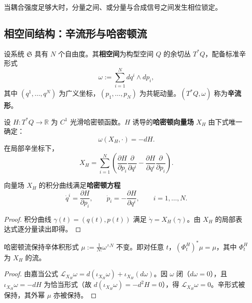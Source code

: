 \begin{proposition}[相位锁定]\label{prop:phase-locking}
当耦合强度足够大时，分量之间、或分量与合成信号之间发生相位锁定。
\end{proposition}

\subsection{相空间结构：辛流形与哈密顿流}\label{subsec:ps_phase_space_symplectic}

\begin{definition}[周期系统的相空间]\label{def:ps_phase_space}
设系统 $\mathfrak{S}$ 具有 $N$ 个自由度。其\textbf{相空间}为构型空间 $Q$ 的余切丛 $T^*Q$，配备标准辛形式
\[
\omega := \sum_{i=1}^{N} dq^i\wedge dp_i,
\]
其中 $(q^1,\dots,q^N)$ 为广义坐标，$(p_1,\dots,p_N)$ 为共轭动量。$(T^*Q,\omega)$ 称为\textbf{辛流形}。
\end{definition}

\begin{definition}[哈密顿向量场]\label{def:ps_hamiltonian_field}
设 $H:T^*Q\to\mathbb{R}$ 为 $C^1$ 光滑哈密顿函数。$H$ 诱导的\textbf{哈密顿向量场} $X_H$ 由下式唯一确定：
\[
\omega(X_H,\cdot) = -dH.
\]
在局部辛坐标下，
\[
X_H = \sum_{i=1}^{N}\left(\frac{\partial H}{\partial p_i}\frac{\partial}{\partial q^i} - \frac{\partial H}{\partial q^i}\frac{\partial}{\partial p_i}\right).
\]
\end{definition}

\begin{proposition}[哈密顿方程的局部形式]\label{prop:ps_hamiltonian_equations}
向量场 $X_H$ 的积分曲线满足\textbf{哈密顿方程}
\[
\dot{q}^i = \frac{\partial H}{\partial p_i}, \qquad \dot{p}_i = -\frac{\partial H}{\partial q^i}, \qquad i = 1,\dots,N.
\]
\end{proposition}

\begin{proof}
积分曲线 $\gamma(t) = (q(t), p(t))$ 满足 $\dot{\gamma} = X_H(\gamma)$。由 $X_H$ 的局部表达式逐分量读出即得。
\end{proof}

\begin{theorem}[刘维尔定理]\label{thm:ps_liouville}
哈密顿流保持辛体积形式 $\mu := \frac{1}{N!}\omega^{\wedge N}$ 不变。即对任意 $t$，$(\Phi_t^H)^*\mu = \mu$，其中 $\Phi_t^H$ 为 $X_H$ 的流。
\end{theorem}

\begin{proof}
由嘉当公式 $\mathcal{L}_{X_H}\omega = d(\iota_{X_H}\omega) + \iota_{X_H}(d\omega)$。因 $\omega$ 闭（$d\omega=0$），且 $\iota_{X_H}\omega = -dH$ 为恰当形式（故 $d(\iota_{X_H}\omega) = -d^2 H = 0$），得 $\mathcal{L}_{X_H}\omega = 0$。辛形式被保持，其外幂 $\mu$ 亦被保持。
\end{proof}

